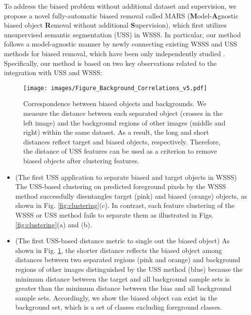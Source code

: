 \documentclass[10pt,twocolumn,letterpaper]{article}
\begin{document}
To address the biased problem without additional dataset and supervision, we propose a novel fully-automatic biased removal called MARS (\textbf{M}odel-\textbf{A}gnostic biased object \textbf{R}emoval without additional \textbf{S}upervision), which first utilizes unsupervised semantic segmentation (USS) in WSSS. In particular, our method follows a model-agnostic manner by newly connecting existing WSSS and USS methods for biased removal, which have been only independently studied \cite{jo2022recurseed, hamilton2022unsupervised}. Specifically, our method is based on two key observations related to the integration with USS and WSSS:

\begin{figure}[t]
  \centering
  \texttt{[image: images/Figure\_Background\_Correlations\_v5.pdf]}
\caption{
      Correspondence between biased objects and backgrounds. We measure the distance between each separated object (crosses in the left image) and the background regions of other images (middle and right) within the same dataset. As a result, the long and short distances reflect target and biased objects, respectively. Therefore, the distance of USS features can be used as a criterion to remove biased objects after clustering features. 
  }
  \label{fig:bg_correlation}
  \vspace{-0.4cm}
\end{figure}



\begin{itemize}
\item (The first USS application to separate biased and target objects in WSSS) The USS-based clustering on predicted foreground pixels by the WSSS method successfully disentangles target (pink) and biased (orange) objects, as shown in Fig. \ref{fig:clustering}(c). In contrast, each feature clustering of the WSSS or USS method fails to separate them as illustrated in Figs. \ref{fig:clustering}(a) and (b).
\vspace{-0.2cm}
\item (The first USS-based distance metric to single out the biased object) As shown in Fig. \ref{fig:bg_correlation}, the shorter distance reflects the biased object among distances between two separated regions (pink and orange) and background regions of other images distinguished by the USS method (blue) because the minimum distance between the target and all background sample sets is greater than the minimum distance between the bias and all background sample sets. Accordingly, we show the biased object can exist in the background set, which is a set of classes excluding foreground classes.
\end{itemize}
\end{document}
